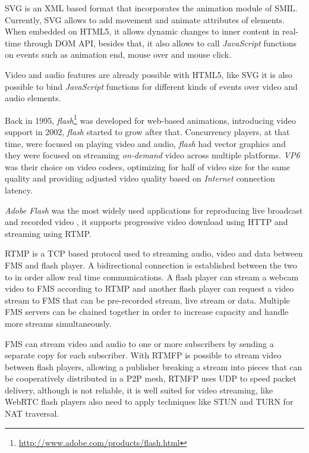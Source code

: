   \ac{SVG} is an \ac{XML} based format that incorporates the animation module of \ac{SMIL}. Currently, \ac{SVG} allows to add movement and animate attributes of elements. When embedded on \ac{HTML}5, it allows dynamic changes to inner content in real-time through \ac{DOM} \ac{API}, besides that, it also allows to call \emph{JavaScript} functions on events such as animation end, mouse over and mouse click.

  Video and audio features are already possible with \ac{HTML}5, like \ac{SVG} it is also possible to bind \emph{JavaScript} functions for different kinds of events over video and audio elements.

  Back in 1995, \emph{flash}\footnote{\url{http://www.adobe.com/products/flash.html}} was developed for web-based animations, introducing video support in 2002, \emph{flash} started to grow after that. Concurrency players, at that time, were focused on playing video and audio, \emph{flash} had vector graphics and they were focused on streaming \emph{on-demand} video across multiple platforms. \emph{VP6} was their choice on video codecs, optimizing for half of video size for the same quality and providing adjusted video quality based on \emph{Internet} connection latency. 

  \emph{Adobe Flash} was the most widely used applications for reproducing live broadcast and recorded video \cite{flashvideo}, it supports progressive video download using \ac{HTTP} and streaming using \ac{RTMP}. 

  \ac{RTMP} is a \ac{TCP} based protocol used to streaming audio, video and data between \ac{FMS} and flash player. A bidirectional connection is established between the two to in order allow real time communications. A flash player can stream a webcam video to \ac{FMS} according to \ac{RTMP} and another flash player can request a video stream to \ac{FMS} that can be pre-recorded stream, live stream or data. Multiple \ac{FMS} servers can be chained together in order to increase capacity and handle more streams simultaneously.

  \ac{FMS} can stream video and audio to one or more subscribers by sending a separate copy for each subscriber. With \ac{RTMFP} is possible to stream video between flash players, allowing a publisher breaking a stream into pieces that can be cooperatively distributed in a P2P mesh, \ac{RTMFP} uses \ac{UDP} to speed packet delivery, although is not reliable, it is well suited for video streaming, like \ac{WebRTC} flash players also need to apply techniques like \ac{STUN} and \ac{TURN} for \ac{NAT} traversal.

